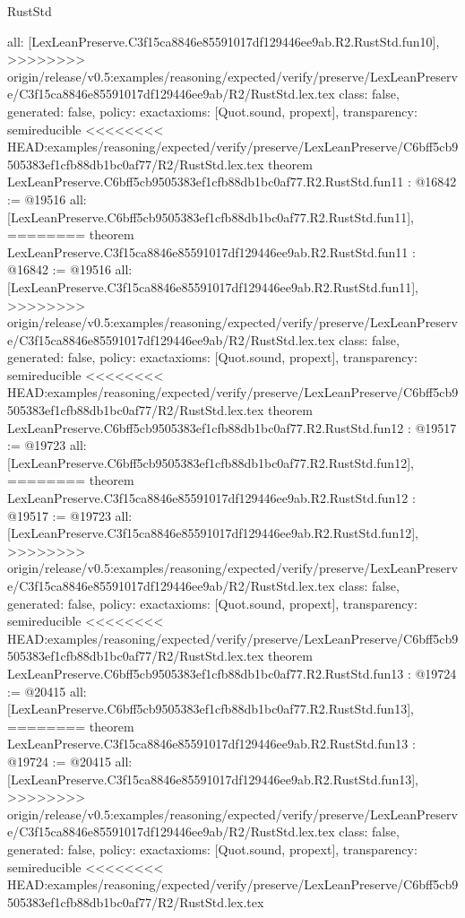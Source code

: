\begin{lexlean}{RustStd}
\begin{coremodule}
{\begin{coremodule}
{{{{{{{{{{{{{{  all: [LexLeanPreserve.C3f15ca8846e85591017df129446ee9ab.R2.RustStd.fun10],
>>>>>>>> origin/release/v0.5:examples/reasoning/expected/verify/preserve/LexLeanPreserve/C3f15ca8846e85591017df129446ee9ab/R2/RustStd.lex.tex
  class: false,
  generated: false,
  policy: exact{axioms: [Quot.sound, propext]},
  transparency: semireducible
}
<<<<<<<< HEAD:examples/reasoning/expected/verify/preserve/LexLeanPreserve/C6bff5cb9505383ef1cfb88db1bc0af77/R2/RustStd.lex.tex
theorem LexLeanPreserve.C6bff5cb9505383ef1cfb88db1bc0af77.R2.RustStd.fun11 : @16842 := @19516 {
  all: [LexLeanPreserve.C6bff5cb9505383ef1cfb88db1bc0af77.R2.RustStd.fun11],
========
theorem LexLeanPreserve.C3f15ca8846e85591017df129446ee9ab.R2.RustStd.fun11 : @16842 := @19516 {
  all: [LexLeanPreserve.C3f15ca8846e85591017df129446ee9ab.R2.RustStd.fun11],
>>>>>>>> origin/release/v0.5:examples/reasoning/expected/verify/preserve/LexLeanPreserve/C3f15ca8846e85591017df129446ee9ab/R2/RustStd.lex.tex
  class: false,
  generated: false,
  policy: exact{axioms: [Quot.sound, propext]},
  transparency: semireducible
}
<<<<<<<< HEAD:examples/reasoning/expected/verify/preserve/LexLeanPreserve/C6bff5cb9505383ef1cfb88db1bc0af77/R2/RustStd.lex.tex
theorem LexLeanPreserve.C6bff5cb9505383ef1cfb88db1bc0af77.R2.RustStd.fun12 : @19517 := @19723 {
  all: [LexLeanPreserve.C6bff5cb9505383ef1cfb88db1bc0af77.R2.RustStd.fun12],
========
theorem LexLeanPreserve.C3f15ca8846e85591017df129446ee9ab.R2.RustStd.fun12 : @19517 := @19723 {
  all: [LexLeanPreserve.C3f15ca8846e85591017df129446ee9ab.R2.RustStd.fun12],
>>>>>>>> origin/release/v0.5:examples/reasoning/expected/verify/preserve/LexLeanPreserve/C3f15ca8846e85591017df129446ee9ab/R2/RustStd.lex.tex
  class: false,
  generated: false,
  policy: exact{axioms: [Quot.sound, propext]},
  transparency: semireducible
}
<<<<<<<< HEAD:examples/reasoning/expected/verify/preserve/LexLeanPreserve/C6bff5cb9505383ef1cfb88db1bc0af77/R2/RustStd.lex.tex
theorem LexLeanPreserve.C6bff5cb9505383ef1cfb88db1bc0af77.R2.RustStd.fun13 : @19724 := @20415 {
  all: [LexLeanPreserve.C6bff5cb9505383ef1cfb88db1bc0af77.R2.RustStd.fun13],
========
theorem LexLeanPreserve.C3f15ca8846e85591017df129446ee9ab.R2.RustStd.fun13 : @19724 := @20415 {
  all: [LexLeanPreserve.C3f15ca8846e85591017df129446ee9ab.R2.RustStd.fun13],
>>>>>>>> origin/release/v0.5:examples/reasoning/expected/verify/preserve/LexLeanPreserve/C3f15ca8846e85591017df129446ee9ab/R2/RustStd.lex.tex
  class: false,
  generated: false,
  policy: exact{axioms: [Quot.sound, propext]},
  transparency: semireducible
}
<<<<<<<< HEAD:examples/reasoning/expected/verify/preserve/LexLeanPreserve/C6bff5cb9505383ef1cfb88db1bc0af77/R2/RustStd.lex.tex
}}}}}}}}}}}}}}}}
\end{coremodule}}
\end{coremodule}
\end{lexlean}
